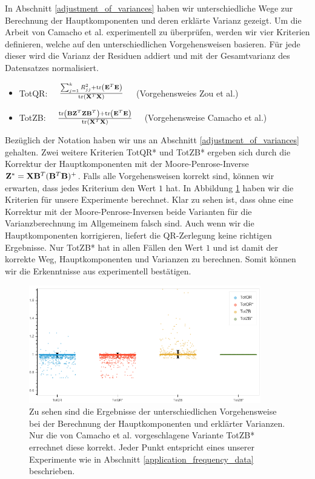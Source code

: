 In Abschnitt \ref{adjustment_of_variances} haben wir unterschiedliche Wege zur Berechnung der Hauptkomponenten und deren erklärte Varianz gezeigt. Um die Arbeit von Camacho et al. \cite{camacho} experimentell zu überprüfen, werden wir vier Kriterien definieren, welche auf den unterschiedlichen Vorgehensweisen basieren. Für jede dieser wird die Varianz der Residuen addiert und mit der Gesamtvarianz des Datensatzes normalisiert.
\begin{itemize}
\item TotQR: $\quad \frac{\sum_{j=1}^k R_{jj}^2 + \text{tr} \left( \mathbf{E}^T\mathbf{E} \right)}{\text{tr} \left( \mathbf{X}^T\mathbf{X} \right)} \quad$ (Vorgehensweies Zou et al.)
\item TotZB: $\quad \frac{\text{tr} \left( \mathbf{B} \mathbf{Z}^T \mathbf{Z} \mathbf{B}^T \right) + \text{tr} \left( \mathbf{E}^T\mathbf{E} \right)}{\text{tr} \left( \mathbf{X}^T\mathbf{X} \right)} \quad$ (Vorgehensweise Camacho et al.)
\end{itemize}
Bezüglich der Notation haben wir uns an Abschnitt \ref{adjustment_of_variances} gehalten. Zwei weitere Kriterien TotQR* und TotZB* ergeben sich durch die Korrektur der Hauptkomponenten mit der Moore-Penrose-Inverse $\mathbf{Z}^* = \mathbf{X} \mathbf{B}^T (\mathbf{B}^T\mathbf{B})^+$. Falls alle Vorgehensweisen korrekt sind, können wir erwarten, dass jedes Kriterium den Wert $1$ hat. In Abbildung \ref{total_variance_validation} haben wir die Kriterien für unsere Experimente berechnet. Klar zu sehen ist, dass ohne eine Korrektur mit der Moore-Penrose-Inversen beide Varianten für die Varianzberechnung im Allgemeinem falsch sind. Auch wenn wir die Hauptkomponenten korrigieren, liefert die QR-Zerlegung keine richtigen Ergebnisse. Nur TotZB* hat in allen Fällen den Wert $1$ und ist damit der korrekte Weg, Hauptkomponenten und Varianzen zu berechnen. Somit können wir die Erkenntnisse aus \cite{camacho} experimentell bestätigen.

\begin{figure}
\centering
\includegraphics[width = 0.9\textwidth]{figures/total_variance_validation.png}
\caption{Zu sehen sind die Ergebnisse der unterschiedlichen Vorgehensweise bei der Berechnung der Hauptkomponenten und erklärter Varianzen. Nur die von Camacho et al. vorgeschlagene Variante TotZB* errechnet diese korrekt. Jeder Punkt entspricht eines unserer Experimente wie in Abschnitt \ref{application_frequency_data} beschrieben.}
\label{total_variance_validation}
\end{figure}
